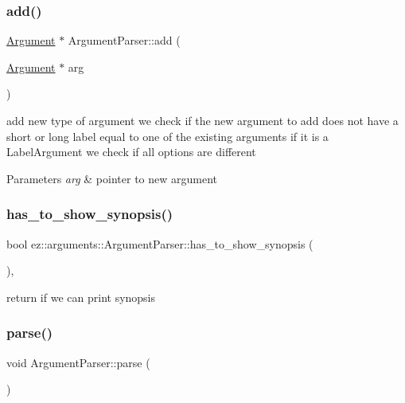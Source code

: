 \subsubsection{\texorpdfstring{add()}{add()}}
{\footnotesize\ttfamily \hyperlink{classez_1_1arguments_1_1Argument}{Argument} $\ast$ Argument\+Parser\+::add (\begin{DoxyParamCaption}\item[{\hyperlink{classez_1_1arguments_1_1Argument}{Argument} $\ast$}]{arg }\end{DoxyParamCaption})}

add new type of argument we check if the new argument to add does not have a short or long label equal to one of the existing arguments if it is a Label\+Argument we check if all options are different 
\begin{DoxyParams}{Parameters}
{\em arg} & pointer to new argument \\
\hline
\end{DoxyParams}
\mbox{\label{classez_1_1arguments_1_1ArgumentParser_ace31a847d871c5c6c85db03716fa7047}} 
\subsubsection{\texorpdfstring{has\+\_\+to\+\_\+show\+\_\+synopsis()}{has\_to\_show\_synopsis()}}
{\footnotesize\ttfamily bool ez\+::arguments\+::\+Argument\+Parser\+::has\+\_\+to\+\_\+show\+\_\+synopsis (\begin{DoxyParamCaption}{ }\end{DoxyParamCaption})\hspace{0.3cm}{\ttfamily [inline]}, {\ttfamily [protected]}}

return if we can print synopsis \mbox{\label{classez_1_1arguments_1_1ArgumentParser_a740720f7b71d51c66b2211689cccf595}} 
\subsubsection{\texorpdfstring{parse()}{parse()}}
{\footnotesize\ttfamily void Argument\+Parser\+::parse (\begin{DoxyParamCaption}{ }\end{DoxyParamCaption})}

